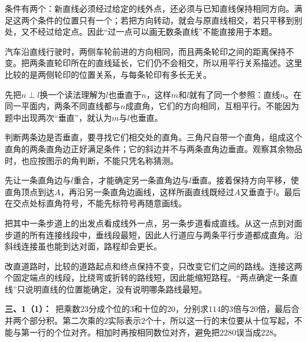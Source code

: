 \documentclass[multi=snippet,border=0pt]{standalone}
\newenvironment{snippet}[3]{\begin{minipage}{#1bp}\color{answerred}\fontsize{#2}{#3}\selectfont\raggedright}{\end{minipage}}
\begin{document}
\begin{snippet}{505}{11.5}{14}条件有两个：新直线必须经过给定的线外点，还必须与已知直线保持相同方向。满足这两个条件的位置只有一个；若把方向转动，就会与原直线相交，若只平移到别处，又不经过给定点。因此“过一点可以画无数条直线”不能直接用于本题。\end{snippet}
\begin{snippet}{505}{11.5}{14}汽车沿直线行驶时，两侧车轮前进的方向相同，而且两条轮印之间的距离保持不变。把两条直轮印所在的直线延长，它们仍不会相交，所以用平行关系描述。这里比较的是两侧轮印的位置关系，与每条轮印有多长无关。\end{snippet}
\begin{snippet}{505}{11.5}{14}先把\(n\perp l\)换一个读法理解为\(l\)也垂直于\(n\)，这样\(m\)和\(l\)就有了同一个参照：直线\(n\)。在同一平面内，两条不同直线都与\(n\)成直角，它们的方向相同，互相平行。不能因为题中出现两次“垂直”，就认为\(m\)与\(l\)也垂直。\end{snippet}
\begin{snippet}{505}{11.5}{14}判断两条边是否垂直，要寻找它们相交处的直角。三角尺自带一个直角，组成这个直角的两条直角边正好满足条件；它的斜边并不与两条直角边垂直。观察其余物品时，也应按图示的角判断，不能只凭名称猜测。\end{snippet}
\begin{snippet}{505}{11.5}{14}先让一条直角边与\(l\)重合，才能确定另一条直角边与\(l\)垂直。接着保持方向平移，使直角顶点到达\(A\)，再沿另一条直角边画线，这样所画直线既经过\(A\)又垂直于\(l\)。最后在交点处标直角符号，不能先标符号再随意画线。\end{snippet}
\begin{snippet}{505}{11.5}{14}把其中一条步道上的出发点看成线外一点，另一条步道看成直线。从这一点到对面步道的所有连接线段中，垂线段最短，因此人行道应与两条平行步道都成直角。沿斜线连接虽也能到达对面，路程却会更长。\end{snippet}
\begin{snippet}{505}{11.5}{14}改直道路时，比较的道路起点和终点保持不变，只改变它们之间的路线。连接这两个固定端点的线段，比绕弯或折转的路线短，因此能缩短路程。“两点确定一条直线”只说明直线的位置能确定，没有说明哪条路线最短。\end{snippet}
\begin{snippet}{505}{11.5}{14}\textbf{三、1（1）：}\ 把乘数\(23\)分成个位的\(3\)和十位的\(20\)，分别求\(114\)的\(3\)倍与\(20\)倍，最后合并两个部分积。第二次乘的\(2\)实际表示\(2\)个十，所以这一行的末位要从十位写起，不能与第一行的个位对齐。相加时再按相同数位对齐，避免把\(2280\)误当成\(228\)。\end{snippet}
\end{document}
